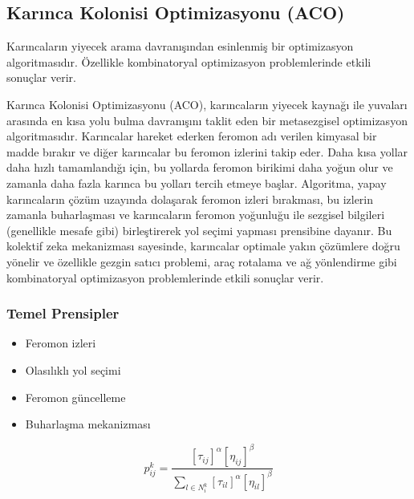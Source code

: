 \subsection{Karınca Kolonisi Optimizasyonu (ACO)}
Karıncaların yiyecek arama davranışından esinlenmiş bir optimizasyon algoritmasıdır. Özellikle kombinatoryal optimizasyon problemlerinde etkili sonuçlar verir.

Karınca Kolonisi Optimizasyonu (ACO), karıncaların yiyecek kaynağı ile yuvaları arasında en kısa yolu bulma davranışını taklit eden bir metasezgisel optimizasyon algoritmasıdır. Karıncalar hareket ederken feromon adı verilen kimyasal bir madde bırakır ve diğer karıncalar bu feromon izlerini takip eder. Daha kısa yollar daha hızlı tamamlandığı için, bu yollarda feromon birikimi daha yoğun olur ve zamanla daha fazla karınca bu yolları tercih etmeye başlar. Algoritma, yapay karıncaların çözüm uzayında dolaşarak feromon izleri bırakması, bu izlerin zamanla buharlaşması ve karıncaların feromon yoğunluğu ile sezgisel bilgileri (genellikle mesafe gibi) birleştirerek yol seçimi yapması prensibine dayanır. Bu kolektif zeka mekanizması sayesinde, karıncalar optimale yakın çözümlere doğru yönelir ve özellikle gezgin satıcı problemi, araç rotalama ve ağ yönlendirme gibi kombinatoryal optimizasyon problemlerinde etkili sonuçlar verir.

\subsubsection{Temel Prensipler}
\begin{itemize}
    \item Feromon izleri
    \item Olasılıklı yol seçimi
    \item Feromon güncelleme
    \item Buharlaşma mekanizması
\end{itemize}

\begin{equation}
p_{ij}^k = \frac{[\tau_{ij}]^\alpha [\eta_{ij}]^\beta}{\sum_{l \in N_i^k} [\tau_{il}]^\alpha [\eta_{il}]^\beta}
\end{equation}


